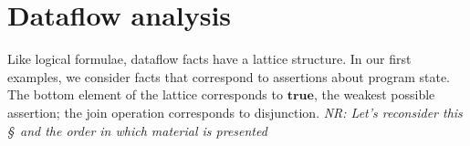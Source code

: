\documentclass[blockstyle,preprint,nocopyrightspace]{sigplanconf}
\let\cite\citep
\newcommand\true{\ensuremath{\mathbf{true}}}
\newcommand{\authornote}[1]{{\em #1}}
\newcommand{\norman}[1]{\authornote{NR: #1}}
\let\remark\norman
\newcommand\seclabel[1]{\label{sec:#1}}
\begin{document}




\section{Dataflow analysis} 

\seclabel{analysis-interface}


Like logical formulae, dataflow facts have a lattice structure.
In our first examples, we consider facts that correspond to assertions
about program state.
The bottom element of the lattice corresponds to \true, the weakest
possible assertion;
the join operation corresponds to disjunction.
\remark{Let's reconsider this \S\ and the order in which material is presented}
\end{document}
